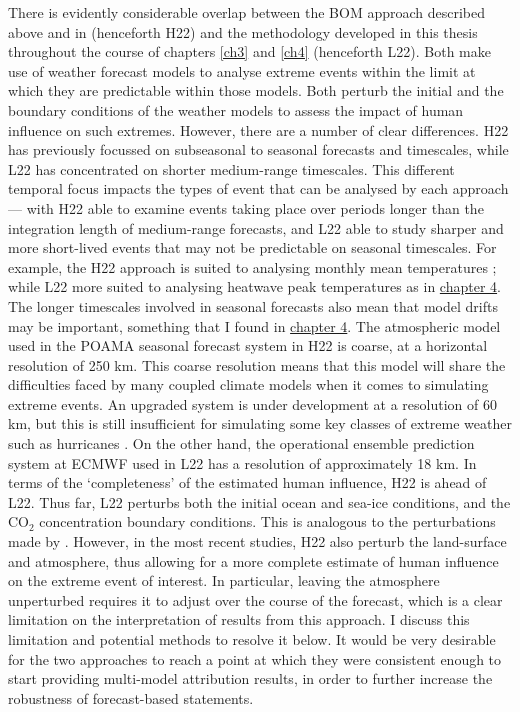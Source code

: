    There is evidently considerable overlap between the BOM approach described above and in \citet{hope_subseasonal_2022} (henceforth H22) and the methodology developed in this thesis throughout the course of chapters \ref{ch3} and \ref{ch4} (henceforth L22). Both make use of weather forecast models to analyse extreme events within the limit at which they are predictable within those models. Both perturb the initial and the boundary conditions of the weather models to assess the impact of human influence on such extremes. However, there are a number of clear differences. H22 has previously focussed on subseasonal to seasonal forecasts and timescales, while L22 has concentrated on shorter medium-range timescales. This different temporal focus impacts the types of event that can be analysed by each approach --- with H22 able to examine events taking place over periods longer than the integration length of medium-range forecasts, and L22 able to study sharper and more short-lived events that may not be predictable on seasonal timescales. For example, the H22 approach is suited to analysing monthly mean temperatures \citep{hope_contributors_2015}; while L22 more suited to analysing heatwave peak temperatures as in \hyperref[ch4]{chapter 4}. The longer timescales involved in seasonal forecasts also mean that model drifts may be important, something that I found in \hyperref[ch4]{chapter 4}. The atmospheric model used in the POAMA seasonal forecast system in H22 is coarse, at a horizontal resolution of 250 km. This coarse resolution means that this model will share the difficulties faced by many coupled climate models when it comes to simulating extreme events. An upgraded system is under development at a resolution of 60 km, but this is still insufficient for simulating some key classes of extreme weather such as hurricanes \citep{hope_subseasonal_2022,patricola_anthropogenic_2018}. On the other hand, the operational ensemble prediction system at ECMWF used in L22 has a resolution of approximately 18 km. In terms of the `completeness' of the estimated human influence, H22 is ahead of L22. Thus far, L22 perturbs both the initial ocean and sea-ice conditions, and the CO$_2$ concentration boundary conditions. This is analogous to the perturbations made by \citet[][though they did not perturb the sea ice]{hope_contributors_2015}. However, in the most recent studies, H22 also perturb the land-surface and atmosphere, thus allowing for a more complete estimate of human influence on the extreme event of interest. In particular, leaving the atmosphere unperturbed requires it to adjust over the course of the forecast, which is a clear limitation on the interpretation of results from this approach. I discuss this limitation and potential methods to resolve it below. It would be very desirable for the two approaches to reach a point at which they were consistent enough to start providing multi-model attribution results, in order to further increase the robustness of forecast-based statements.

